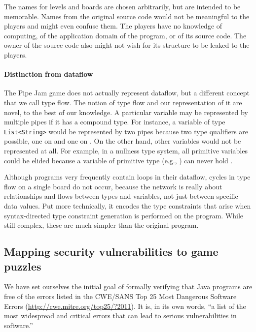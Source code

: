 \documentclass{sig-alternate}
\def\<#1>{\codeid{#1}}
\newcommand{\codeid}[1]{\ifmmode{\mbox{\ttfamily{#1}}}\else{\ttfamily #1}\fi}
\begin{document}
The names for levels and boards are chosen arbitrarily, but are intended to
be memorable.  Names from the original source code would not be meaningful
to the players and might even confuse them.  The players have no knowledge
of computing, of the application domain of the program, or of its source
code.  The owner of the source code also might not wish for its structure
to be leaked to the players.

\paragraph{Distinction from dataflow}
The Pipe Jam game does not actually represent dataflow, but a
different concept that we call type flow.  The notion of type flow and our
representation of it are
novel, to the best of our knowledge.  A particular variable may be
represented by multiple pipes if it has a compound type.  For
instance, a variable of type \verb|List<String>| would be represented
by two pipes because two type qualifiers are possible, one on \<List>
and one on \<String>.  On the other hand, other variables would not be
represented at all.  For example, in a nullness type system, all
primitive variables could be elided because a variable of primitive
type (e.g., \<int>) can never hold \<null>.


Although programs very frequently contain loops in their dataflow,
cycles in type flow on a single board do not occur, because the network is really
about relationships and flows between types and variables, not just
between specific data values.  Put more technically, it encodes the
type constraints that arise when syntax-directed type constraint
generation is performed on the program.  While still complex, these
are much simpler than the original program.


\subsection{Mapping security vulnerabilities to game puzzles}

We have set ourselves the initial goal of formally verifying that Java
programs are free of the errors
listed in the CWE/SANS Top 25 Most Dangerous Software Errors
(\url{http://cwe.mitre.org/top25/?2011}).  It is, in its own words,
``a list of the most widespread and critical errors that can lead to
serious vulnerabilities in software.''
\end{document}
